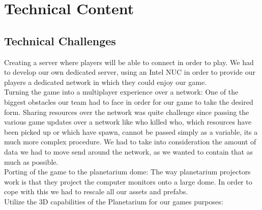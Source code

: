 \chapter{Technical Content}







\section{Technical Challenges}
\markboth{\MakeUppercase{\thechapter}}
Creating a server where players will be able to connect in order to play. We had to develop our own dedicated server, using an Intel NUC in order to provide our players a dedicated network in which they could enjoy our game.\\

Turning the game into a multiplayer experience over a network: One of the biggest obstacles our team had to face in order for our game to take the desired form. Sharing resources over the network was quite challenge since passing the various game updates over a network like who killed who, which resources have been picked up or which have spawn, cannot be passed simply as a variable, its a much more complex procedure. We had to take into consideration the amount of data we had to move send around the network, as we wanted to contain that as much as possible.\\

Porting of the game to the planetarium dome: The way planetarium projectors work is that they project the computer monitors onto a large dome. In order to cope with this we had to rescale all our assets and prefabs.\\

Utilize the 3D capabilities of the Planetarium for our games purposes:



